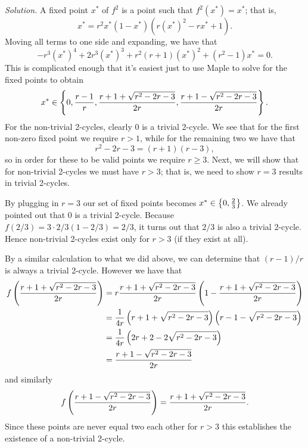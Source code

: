 \documentclass{article}
\newcommand{\xs}{x^*}
\begin{document}
\textit{Solution.}
A fixed point $\xs$ of $f^2$ is a point such that $f^2(\xs) = \xs$; that
is,
%
\begin{equation*}
    \xs = r^2 \xs (1 - \xs) (r (\xs)^2 - r \xs + 1)
    .
\end{equation*}
%
Moving all terms to one side and expanding, we have that
%
\begin{equation*}
    -r^3 (\xs)^4 + 2 r^3 (\xs)^3 + r^2(r + 1) (\xs)^2 + (r^2 - 1) \xs = 0
    .
\end{equation*}
%
This is complicated enough that it's easiest just to use Maple to solve
for the fixed points to obtain
%
\begin{equation*}
    \xs \in \cbr{
        0,
        \frac{r - 1}{r},
        \frac{r + 1 + \sqrt{r^2 - 2 r - 3}}{2 r},
        \frac{r + 1 - \sqrt{r^2 - 2 r - 3}}{2 r}
    }
    .
\end{equation*}
%
For the non-trivial 2-cycles, clearly $0$ is a trivial 2-cycle. We see
that for the first non-zero fixed point we require $r > 1$, while for
the remaining two we have that
%
\begin{equation*}
    r^2 - 2 r - 3 = (r + 1) (r - 3)
    ,
\end{equation*}
%
so in order for these to be valid points we require $r \geq 3$. Next,
we will show that for non-trivial 2-cycles we must have $r > 3$; that is,
we need to show $r = 3$ results in trivial 2-cycles.

By plugging in $r = 3$ our set of fixed points becomes $\xs \in \cbr{0,
\frac{2}{3}}$. We already pointed out that $0$ is a trivial 2-cycle.
Because $f(2/3) = 3 \cdot 2 / 3 (1 - 2/3) = 2/3$, it turns out that
$2/3$ is also a trivial 2-cycle. Hence non-trivial 2-cycles exist only
for $r > 3$ (if they exist at all).

By a similar calculation to what we did above, we can determine that
$(r - 1) / r$ is always a trivial 2-cycle. However we have that
%
\begin{align*}
    f\del{\frac{r + 1 + \sqrt{r^2 - 2 r - 3}}{2 r}}
        &= r \frac{r + 1 + \sqrt{r^2 - 2 r - 3}}{2 r} \del{1 - \frac{r + 1 + \sqrt{r^2 - 2 r - 3}}{2 r}} \\
        &= \frac{1}{4 r} \del{r + 1 + \sqrt{r^2 - 2 r - 3}} \del{r - 1 - \sqrt{r^2 - 2 r - 3}} \\
        &= \frac{1}{4 r} \del{2 r + 2 - 2 \sqrt{r^2 - 2 r - 3}} \\
        &= \frac{r + 1 - \sqrt{r^2 - 2 r - 3}}{2 r}
\end{align*}
%
and similarly
%
\begin{equation*}
    f\del{\frac{r + 1 - \sqrt{r^2 - 2 r - 3}}{2 r}}
        = \frac{r + 1 + \sqrt{r^2 - 2 r - 3}}{2 r}
    .
\end{equation*}
%
Since these points are never equal two each other for $r > 3$ this
establishes the existence of a non-trivial 2-cycle.
\end{document}
